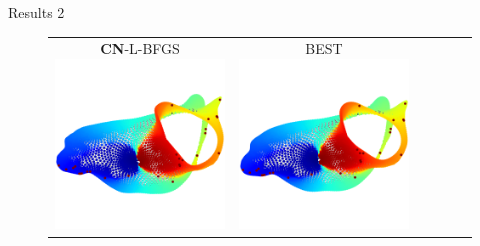 \documentclass[dvipdfmx,13pt,aspectratio=169]{beamer}
\newif\ifShowHidden
\begin{document}
\begin{frame}{Results 2}
\begin{figure}[h]
\begin{tabular}{cccccc}
      \makecell{\small{\textsf{\textbf{CN}-L-BFGS}}                                                                                                        \\[-0.2em]\includegraphics[width=0.135\columnwidth]{../main/individual/vis/3elt_CN-L-BFGS.png}} &
      \makecell{\small{\textsf{BEST}}                                                                                                                      \\[-0.2em]\includegraphics[width=0.135\columnwidth]{../main/individual/vis/opt_3elt.png}} \\
    \end{tabular}
  \end{figure}
\end{frame}

\end{document}
